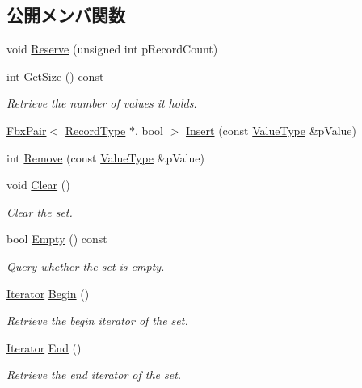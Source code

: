 \subsection*{公開メンバ関数}
\begin{DoxyCompactItemize}
\item 
void \hyperlink{class_fbx_set_ac7d73b7db8fe03350e2ced16ffff1c36}{Reserve} (unsigned int p\+Record\+Count)
\item 
int \hyperlink{class_fbx_set_a461c8f7332c997970eeb89cf7920b509}{Get\+Size} () const
\begin{DoxyCompactList}\small\item\em Retrieve the number of values it holds. \end{DoxyCompactList}\item 
\hyperlink{class_fbx_pair}{Fbx\+Pair}$<$ \hyperlink{class_fbx_set_aa3934cd434a09288204f5e6c99b9cd01}{Record\+Type} $\ast$, bool $>$ \hyperlink{class_fbx_set_a6663843db5bbd2335842fc77c02f7197}{Insert} (const \hyperlink{class_fbx_set_abb0f1b628634e07825532526e2e92baf}{Value\+Type} \&p\+Value)
\item 
int \hyperlink{class_fbx_set_a12e704b8d6f84a349c27cd40ef4dde11}{Remove} (const \hyperlink{class_fbx_set_abb0f1b628634e07825532526e2e92baf}{Value\+Type} \&p\+Value)
\item 
void \hyperlink{class_fbx_set_afc01fe172f741a42492831b57d44ed8f}{Clear} ()
\begin{DoxyCompactList}\small\item\em Clear the set. \end{DoxyCompactList}\item 
bool \hyperlink{class_fbx_set_a453c342954283c8c7add25804a915b44}{Empty} () const
\begin{DoxyCompactList}\small\item\em Query whether the set is empty. \end{DoxyCompactList}\item 
\hyperlink{class_fbx_set_ad1b543e0f63f04f4d2dc8e9e3da9bcaa}{Iterator} \hyperlink{class_fbx_set_a77e36a10cf4707bce192e1b6fb8dd404}{Begin} ()
\begin{DoxyCompactList}\small\item\em Retrieve the begin iterator of the set. \end{DoxyCompactList}\item 
\hyperlink{class_fbx_set_ad1b543e0f63f04f4d2dc8e9e3da9bcaa}{Iterator} \hyperlink{class_fbx_set_aff72352a00b11a896a960f4b562971de}{End} ()
\begin{DoxyCompactList}\small\item\em Retrieve the end iterator of the set. \end{DoxyCompactList}\item 

\end{DoxyCompactItemize}
